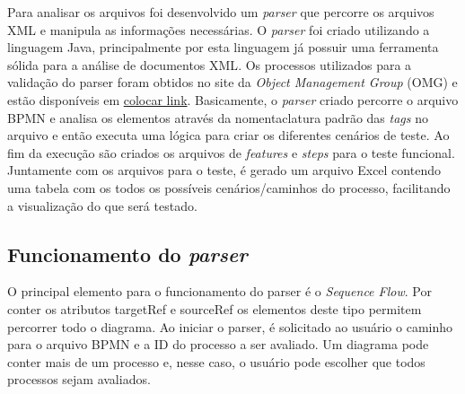 \documentclass[12pt]{article}
\begin{document}
Para analisar os arquivos foi desenvolvido um \emph{parser} que percorre os arquivos XML e manipula as informações necessárias. O \emph{parser} foi criado utilizando a linguagem Java, principalmente por esta linguagem já possuir uma ferramenta sólida para a análise de documentos XML\cite{javadom}.  Os processos utilizados para a validação do parser foram obtidos no site da \emph{Object Management Group} (OMG) e estão disponíveis em \href{https://colocar link}{colocar link}. Basicamente, o \emph{parser} criado percorre o arquivo BPMN e analisa os elementos através da nomentaclatura padrão das \emph{tags} no arquivo e então executa uma lógica para criar os diferentes cenários de teste. Ao fim da execução são criados os arquivos de \emph{features} e \emph{steps} para o teste funcional. Juntamente com os arquivos para o teste, é gerado um arquivo Excel contendo uma tabela com os todos os possíveis cenários/caminhos do processo, facilitando a visualização do que será testado.



\subsection{Funcionamento do \emph{parser}}
O principal elemento para o funcionamento do parser é o \emph{Sequence Flow}. Por conter os atributos targetRef e sourceRef os elementos deste tipo permitem percorrer todo o diagrama. Ao iniciar o parser, é solicitado ao usuário o caminho para o arquivo BPMN e a ID do processo a ser avaliado. Um diagrama pode conter mais de um processo e, nesse caso, o usuário pode escolher que todos processos sejam avaliados.
\end{document}
